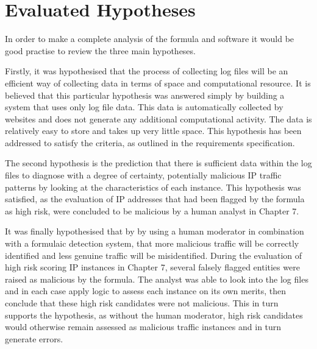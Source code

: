 \section{Evaluated Hypotheses}

In order to make a complete analysis of the formula and software it would be good practise to review the three main hypotheses.  

Firstly, it was hypothesised that the process of collecting log files will be an efficient way of collecting data in terms of space and computational resource. It is believed that this particular hypothesis was answered simply by building a system that uses only log file data. This data is automatically collected by websites and does not generate any additional computational activity. The data is relatively easy to store and takes up very little space. This hypothesis has been addressed to satisfy the criteria, as outlined in the requirements specification.

The second hypothesis is the prediction that there is sufficient data within the log files to diagnose with a degree of certainty, potentially malicious IP traffic patterns by looking at the characteristics of each instance. This hypothesis was satisfied, as the evaluation of IP addresses that had been flagged by the formula as high risk, were concluded to be malicious by a human analyst in Chapter 7.  

It was finally hypothesised that by by using a human moderator in combination with a formulaic detection system, that more malicious traffic will be correctly identified and less genuine traffic will be misidentified. During the evaluation of high risk scoring IP instances in Chapter 7, several falsely flagged entities were raised as malicious by the formula. The analyst was able to look into the log files and in each case apply logic to assess each instance on its own merits, then conclude that these high risk candidates were not malicious. This in turn supports the hypothesis, as without the human moderator, high risk candidates would otherwise remain assessed as malicious traffic instances and in turn generate errors.  

